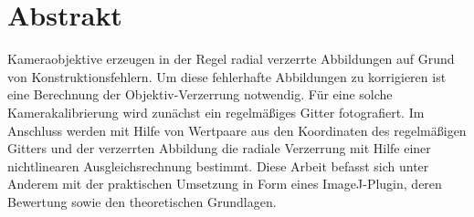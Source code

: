 \section{Abstrakt}
Kameraobjektive erzeugen in der Regel radial verzerrte Abbildungen auf Grund von Konstruktionsfehlern. Um diese fehlerhafte Abbildungen zu korrigieren ist eine Berechnung der Objektiv-Verzerrung notwendig. Für eine solche Kamerakalibrierung wird zunächst ein regelmäßiges Gitter fotografiert. Im Anschluss werden mit Hilfe von Wertpaare aus den Koordinaten des regelmäßigen Gitters und der verzerrten Abbildung die radiale Verzerrung mit Hilfe einer nichtlinearen Ausgleichsrechnung bestimmt. Diese Arbeit befasst sich unter Anderem mit der praktischen Umsetzung in Form eines ImageJ-Plugin, deren Bewertung sowie den theoretischen Grundlagen.  





